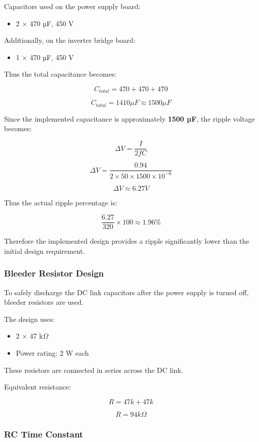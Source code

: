 Capacitors used on the power supply board:

\begin{itemize}
\item 2 × 470 µF, 450 V
\end{itemize}

Additionally, on the inverter bridge board:

\begin{itemize}
\item 1 × 470 µF, 450 V
\end{itemize}

Thus the total capacitance becomes:

\[
C_{total} = 470 + 470 + 470
\]

\[
C_{total} = 1410 \mu F \approx 1500 \mu F
\]

Since the implemented capacitance is approximately \textbf{1500 µF}, the ripple voltage becomes:

\[
\Delta V = \frac{I}{2fC}
\]

\[
\Delta V = \frac{0.94}{2 \times 50 \times 1500 \times 10^{-6}}
\]

\[
\Delta V \approx 6.27V
\]

Thus the actual ripple percentage is:

\[
\frac{6.27}{320} \times 100 \approx 1.96\%
\]

Therefore the implemented design provides a ripple significantly lower than the initial design requirement.

\subsubsection{Bleeder Resistor Design}

To safely discharge the DC link capacitors after the power supply is turned off, bleeder resistors are used.

The design uses:

\begin{itemize}
\item 2 × 47 k$\Omega$
\item Power rating: 2 W each
\end{itemize}

These resistors are connected in series across the DC link.

Equivalent resistance:

\[
R = 47k + 47k
\]

\[
R = 94k\Omega
\]

\subsubsection{RC Time Constant}

